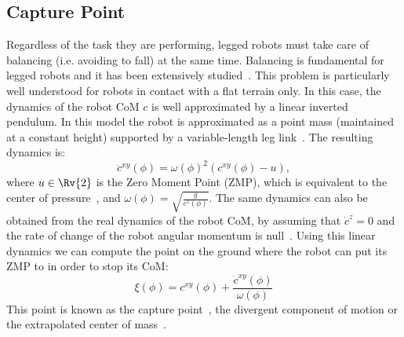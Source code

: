 \subsection{Capture Point}
Regardless of the task they are performing, legged robots must take care of balancing (i.e. avoiding to fall) at the same time.
Balancing is fundamental for legged robots and it has been extensively studied~\cite{Collette2008,Morisawa2012,Goswami2004,Hyon2006,Sherikov}.
This problem is particularly well understood for robots in contact with a flat terrain only.
In this case, the dynamics of the robot CoM $c$ is well approximated by a linear inverted pendulum.
In this model the robot is approximated as a point mass (maintained at a constant height) supported by a variable-length leg link~\cite{Pratt2006}.
The resulting dynamics is:
\begin{equation*}
\ddot{c}^{xy}(\phi) = \omega(\phi)^2 (c^{xy}(\phi) - u),
\end{equation*}
where $u \in \Rv{2}$ is the Zero Moment Point (ZMP), which is equivalent to the center of pressure~\cite{Wieber2002}, and \mbox{$\omega(\phi) = \sqrt{\frac{g}{c^z(\phi)}}$}.
The same dynamics can also be obtained from the real dynamics of the robot CoM, by assuming that $\dot{c}^z=0$ and the rate of change of the robot angular momentum is null~\cite{Wieber}.
Using this linear dynamics we can compute the point on the ground where the robot can put its ZMP to in order to stop its CoM:
\begin{equation*}
\xi(\phi) = c^{xy}(\phi) + \frac{\dot{c}^{xy}(\phi)}{\omega(\phi)}
\end{equation*}
This point is known as the capture point~\cite{Pratt2006}, the divergent component of motion or the extrapolated center of mass~\cite{Wieber}.

